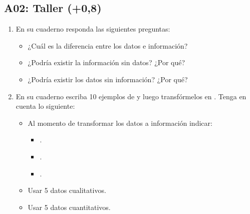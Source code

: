 \documentclass[letterpaper,10pt,spanish]{sphinxmanual}
\begin{document}
\subsection{A02: Taller (+0,8)}
\label{\detokenize{1_guias/8logica/G822:a02-taller-0-8}}
\sphinxAtStartPar
{}
\begin{enumerate}
%
\item {} 
\sphinxAtStartPar
En su cuaderno responda las siguientes preguntas:
\begin{itemize}
\item {} 
\sphinxAtStartPar
¿Cuál es la diferencia entre los datos e información?

\item {} 
\sphinxAtStartPar
¿Podría existir la información sin datos? ¿Por qué?

\item {} 
\sphinxAtStartPar
¿Podría existir los datos sin información? ¿Por qué?

\end{itemize}

\item {} 
\sphinxAtStartPar
En su cuaderno escriba 10 ejemplos de  y luego transfórmelos en . Tenga en cuenta lo siguiente:
\begin{itemize}
\item {} 
\sphinxAtStartPar
Al momento de transformar los datos a información indicar:
\begin{itemize}
\item {} 
\sphinxAtStartPar
{}.

\item {} 
\sphinxAtStartPar
{}.

\item {} 
\sphinxAtStartPar
{}.

\end{itemize}

\item {} 
\sphinxAtStartPar
Usar 5 datos cualitativos.

\item {} 
\sphinxAtStartPar
Usar 5 datos cuantitativos.

\end{itemize}

\end{enumerate}
\end{document}
